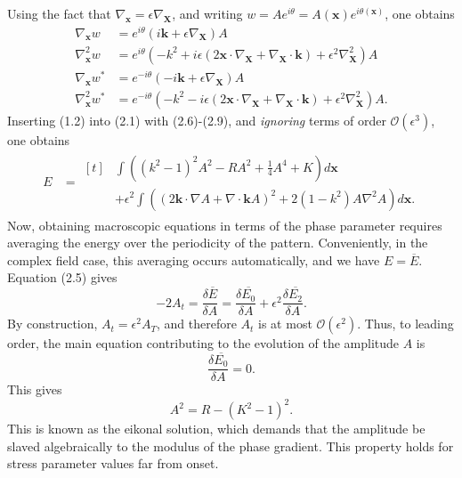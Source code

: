 \documentclass[12pt]{article}
\numberwithin{equation}{section}
\begin{document}
Using the fact that $\nabla_{\bm{x}} = \epsilon\nabla_{\bm{X}}$, and writing $w=Ae^{i\theta}=A(\bm{x})e^{i\theta(\bm{x})}$, one obtains
\begin{align}
    \nabla_{\bm{x}}w &= e^{i\theta}(i\bm{k}+\epsilon\nabla_{\bm{X}})A\\
    \nabla^2_{\bm{x}}w &= e^{i\theta}(-k^2+i\epsilon(2\bm{x}\cdot \nabla_{\bm{X}}+\nabla_{\bm{X}}\cdot\bm{k})+\epsilon^2\nabla^2_{\bm{X}})A\\
 \nabla_{\bm{x}}w^* &= e^{-i\theta}(-i\bm{k}+\epsilon\nabla_{\bm{X}})A\\
    \nabla^2_{\bm{x}}w^* &= e^{-i\theta}(-k^2-i\epsilon(2\bm{x}\cdot \nabla_{\bm{X}}+\nabla_{\bm{X}}\cdot\bm{k})+\epsilon^2\nabla^2_{\bm{X}})A.
\end{align}
Inserting (1.2) into (2.1) with (2.6)-(2.9), and \emph{ignoring} terms of order $\mathcal{O}(\epsilon^3)$, one obtains
\begin{align}
    E &= \begin{aligned}[t]
         &\int \left( (k^2-1)^2A^2 - RA^2 + \frac{1}{4}A^4 + K\right)d\bm{x}\\
         & + \epsilon^2 \int \left( (2\bm{k}\cdot \nabla A + \nabla \cdot \bm{k}A)^2 + 2(1-k^2)A\nabla^2A \right)d\bm{x}.
         \end{aligned}
\end{align}
Now, obtaining macroscopic equations in terms of the phase parameter requires averaging the energy over the periodicity of the pattern. Conveniently, in the complex field case, this averaging occurs automatically, and we have $E = \overline{E}$. Equation (2.5) gives
\begin{equation}
    -2A_t = \frac{\delta \overline{E}}{\delta A} = \frac{\delta\overline{E_0}}{\delta A}+\epsilon^2 \frac{\delta \overline{E_2}}{\delta A}.
\end{equation}
By construction, $A_t = \epsilon^2 A_T$, and therefore $A_t$ is at most $\mathcal{O}(\epsilon^2)$. Thus, to leading order, the main equation contributing to the evolution of the amplitude $A$ is 
\begin{equation}
    \frac{\delta \overline{E_0}}{\delta A} = 0.
\end{equation}
This gives
\begin{equation}
    A^2 = R - (K^2-1)^2.
\end{equation}
This is known as the eikonal solution, which demands that the amplitude be slaved algebraically to the modulus of the phase gradient. This property holds for stress parameter values far from onset. 
\end{document}
